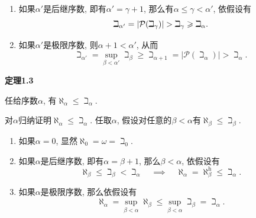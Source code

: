 \begin{enumerate}
    \item 如果$\alpha'$是后继序数, 即有$\alpha'=\gamma+1$,
    那么有$\alpha\leqslant\gamma<\alpha'$, 依假设有
    \vspace{1pt}
    \[
        \beth_{\alpha'}=|\mathcal{P}(\beth_\gamma)|>
        \beth_\gamma\geqslant\beth_\alpha.\\[3pt]
    \]
    \item 如果$\alpha'$是极限序数, 则$\alpha+1<\alpha'$, 从而
    \vspace{1pt}
    \begin{equation*}
        \beth_{\alpha'}=\sup_{\beta<\alpha'}\beth_\beta
        \geqslant\beth_{\alpha+1}=|\mathcal{P}(\beth_\alpha)|>\beth_\alpha.
    \tag*{\qedsymbol}\end{equation*}
\end{enumerate}

\vspace{10pt}

\hypertarget{sec:定理1.3}{}
\noindent\textbf{定理1.3}

任给序数$\alpha$, 有$\aleph_\alpha\leqslant\beth_\alpha$.


对$\alpha$归纳证明$\aleph_\alpha\leqslant\beth_\alpha$.
任取$\alpha$, 假设对任意的$\beta<\alpha$有$\aleph_\beta\leqslant\beth_\beta$.

\begin{enumerate}
    \item 如果$\alpha=0$, 显然$\aleph_0=\omega=\beth_0$.
    \item 如果$\alpha$是后继序数, 即有$\alpha=\beta+1$,
    那么$\beta<\alpha$, 依假设有
    \[
        \aleph_\beta\leqslant\beth_\beta<\beth_\alpha\quad\implies\quad
        \aleph_\alpha=\aleph_\beta^{\mathrm{h}}\leqslant\beth_\alpha.
    \]
    \item 如果$\alpha$是极限序数, 那么依假设有
    \begin{equation*}
        \aleph_\alpha=\sup_{\beta<\alpha}\aleph_\beta\leqslant
        \sup_{\beta<\alpha}\beth_\beta=\beth_\alpha.
    \tag*{\qedsymbol}\end{equation*}
\end{enumerate}

